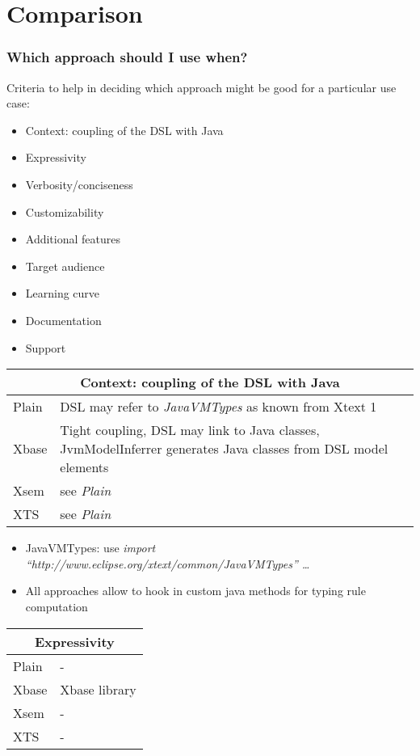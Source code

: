 \section{Comparison}

\begin{frame}
  \frametitle{Which approach should I use when?}
  
  Criteria to help in deciding which approach might be good for a particular use
  case:
  \begin{itemize}
    \item Context: coupling of the DSL with Java
    \item Expressivity
    \item Verbosity/conciseness
    \item Customizability
    \item Additional features
    \item Target audience
    \item Learning curve
    \item Documentation
    \item Support
  \end{itemize}
  
\begin{tabularx}{\linewidth}{ l   X }
\multicolumn{2}{c}{Context: coupling of the DSL with Java} \\ \hline
Plain & DSL may refer to \emph{JavaVMTypes} as known from Xtext 1\\
Xbase & Tight coupling, DSL may link to Java classes, JvmModelInferrer generates
Java classes from DSL model elements\\
Xsem & see \emph{Plain} \\
XTS & see \emph{Plain} \\
\end{tabularx}
\begin{itemize}
  \item JavaVMTypes: use \emph{import
  ``http://\-www.eclipse.org/\-xtext/\-common/\-JavaVMTypes'' \ldots}
  \item All approaches allow to hook in custom java methods for typing rule
  computation
\end{itemize}

\begin{tabularx}{\linewidth}{ l   X }
\multicolumn{2}{c}{Expressivity} \\ \hline
Plain & - \\
Xbase & Xbase library \\
Xsem & - \\
XTS & - \\
\end{tabularx}


\end{frame}
